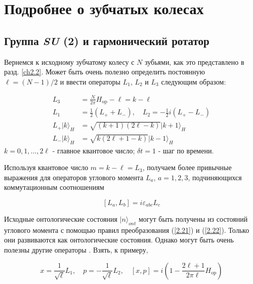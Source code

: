 \documentclass[main.tex]{subfiles}
\begin{document}
\section{Подробнее о зубчатых колесах}\label{ch12}

\subsection{Группа \textit{SU} (2) и гармонический ротатор}\label{ch12.1}

Вернемся к исходному зубчатому колесу с $N$ зубьями, как это представлено в разд. \ref{ch2.2}. Может быть очень полезно определить постоянную $\ell = (N-1)/2$ и ввести операторы $L_1$, $L_2$ и $L_3$ следующим образом:

\begin{equation}\label{12.1}
	\begin{aligned} L_{3} &=\frac{N}{2 \pi} H_{\mathrm{op}}-\ell=k-\ell \\ L_{1} &=\frac{1}{2}\left(L_{+}+L_{-}\right), \quad L_{2}=-\frac{1}{2} i\left(L_{+}-L_{-}\right) \\ L_{+}|k\rangle_{H} &=\sqrt{(k+1)(2 \ell-k)} | k+1\rangle_{H} \\ L_{-}|k\rangle_{H} &=\sqrt{k(2 \ell+1-k)} | k-1\rangle_{H} \end{aligned}
\end{equation}
$k = 0, 1, \ldots, 2\ell$ - главное квантовое число; $\delta t = 1$ - шаг по времени.

Используя квантовое число $m = k - \ell = L_3$, получаем более привычные выражения для операторов углового момента $L_a$, $a = 1, 2, 3$, подчиняющихся коммутационным соотношениям

\begin{equation}\label{12.2}
	\left[L_{a}, L_{b}\right]=i \varepsilon_{a b c} L_{c}
\end{equation}
            
Исходные онтологические состояния $\mid n \rangle_{ont}$ могут быть получены из состояний углового момента с помощью правил преобразования (\ref{2.21}) и (\ref{2.22}). Только они развиваются как онтологические состояния. Однако могут быть очень полезны другие операторы . Взять, к примеру,
   
\begin{equation}\label{12.3}
	x=\frac{1}{\sqrt{\ell}} L_{1}, \quad p=-\frac{1}{\sqrt{\ell}} L_{2}, \quad[x, p]=i\left(1-\frac{2 \ell+1}{2 \pi \ell} H_{\mathrm{op}}\right)
\end{equation}
\end{document}
